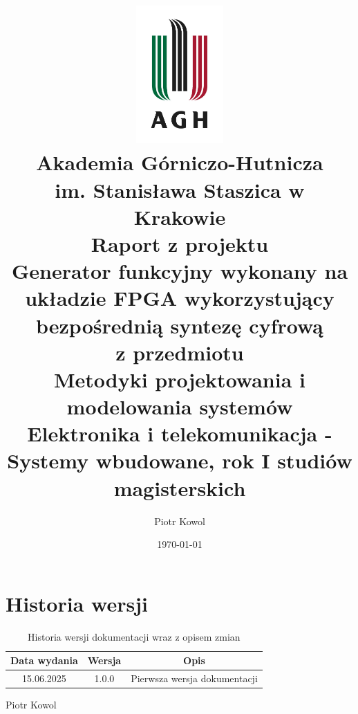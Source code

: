 \documentclass[12pt]{article}
\title{
    \vspace*{-1.5cm}
    \includegraphics[width = 0.25\textwidth]{agh_logo.jpg}\\
    \textbf{Akademia Górniczo-Hutnicza \\im. Stanisława Staszica w Krakowie}\\\vspace{0.5cm}
    Raport z projektu\\\vspace{0.5cm}
    \textbf{Generator funkcyjny wykonany na układzie FPGA wykorzystujący bezpośrednią syntezę cyfrową}\\\vspace{0.5cm}
    \small{z przedmiotu}\\\vspace{0.5cm}
    \huge{\textbf{Metodyki projektowania i modelowania systemów}}\\\vspace{0.5cm}
    \small{Elektronika i telekomunikacja - Systemy wbudowane, rok I studiów magisterskich}
}
\author{Piotr Kowol}
\date{\vspace{1cm}\today}
\numberwithin{equation}{section}
\begin{document}
    \begin{titlepage}
        \maketitle
        \thispagestyle{empty}
    \end{titlepage}
    
        \tableofcontents
        \listoffigures
        \newpage
    
    
    
    
    \clearpage
    
    \clearpage
    \section*{Historia wersji}
    \begin{table}[!ht]
        \centering
        \caption{Historia wersji dokumentacji wraz z opisem zmian}
        \begin{tabular}{|c|c|c|}\hline
            Data wydania & Wersja & Opis \\\hline
            15.06.2025 & 1.0.0 & Pierwsza wersja dokumentacji \\\hline
        \end{tabular}
    \end{table}

    \nocite{*}
    \printbibliography

    \vfill
    \begin{flushright}
        Piotr Kowol
    \end{flushright}
\end{document}
